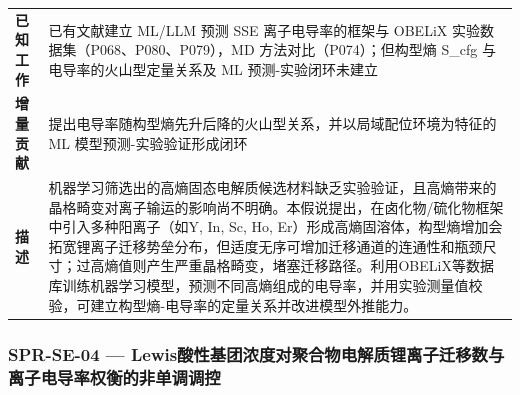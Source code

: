 \documentclass[12pt,a4paper]{ctexart}
\begin{document}
{\begin{longtable}[]{@{}
  >{\raggedright\arraybackslash}p{}
  >{\raggedright\arraybackslash}p{}@{}}
\textbf{已知工作} & 已有文献建立 ML/LLM 预测 SSE 离子电导率的框架与 OBELiX 实验数据集（P068、P080、P079），MD 方法对比（P074）；但构型熵 S\_cfg 与电导率的火山型定量关系及 ML 预测-实验闭环未建立 \\
\textbf{增量贡献} & 提出电导率随构型熵先升后降的火山型关系，并以局域配位环境为特征的 ML 模型预测-实验验证形成闭环 \\
\textbf{描述} & 机器学习筛选出的高熵固态电解质候选材料缺乏实验验证，且高熵带来的晶格畸变对离子输运的影响尚不明确。本假说提出，在卤化物/硫化物框架中引入多种阳离子（如Y, In, Sc, Ho, Er）形成高熵固溶体，构型熵增加会拓宽锂离子迁移势垒分布，但适度无序可增加迁移通道的连通性和瓶颈尺寸；过高熵值则产生严重晶格畸变，堵塞迁移路径。利用OBELiX等数据库训练机器学习模型，预测不同高熵组成的电导率，并用实验测量值校验，可建立构型熵-电导率的定量关系并改进模型外推能力。 \\
\end{longtable}
}

\subsubsection{SPR-SE-04 --- Lewis酸性基团浓度对聚合物电解质锂离子迁移数与离子电导率权衡的非单调调控}\label{spr-se-04-lewisux9178ux6027ux57faux56e2ux6d53ux5ea6ux5bf9ux805aux5408ux7269ux7535ux89e3ux8d28ux9502ux79bbux5b50ux8fc1ux79fbux6570ux4e0eux79bbux5b50ux7535ux5bfcux7387ux6743ux8861ux7684ux975eux5355ux8c03ux8c03ux63a7}
\end{document}
